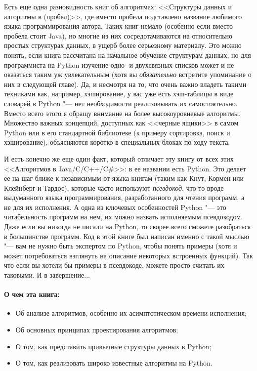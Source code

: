 Есть еще одна разновидность книг об алгоритмах: <<Структуры данных и алгоритмы в (пробел)>>, где вместо пробела подставлено название любимого языка программирования автора. Таких книг немало (особенно если вместо пробела стоит Java), но многие из них сосредотачиваются на относительно простых структурах данных, в ущерб более серьезному материалу. Это можно понять, если книга рассчитана на начальное обучение структурам данных, но для программиста на Python изучение одно- и двухсвязных списков может и не оказаться таким уж увлекательным (хотя вы \textit{обязательно} встретите упоминание о них в следующей главе). Да, и несмотря на то, что очень важно владеть такими техниками как, например, хэширование, у вас уже есть хэш-таблицы в виде словарей в Python "--- нет необходимости реализовывать их самостоятельно. Вместо всего этого я обращу внимание на более высокоуровневые алгоритмы. Множество важных концепций, доступных как <<черные ящики>> в самом Python или в его стандартной библиотеке (к примеру сортировка, поиск и хэширование), объясняются коротко в специальных блоках по ходу текста.

И есть конечно же еще один факт, который отличает эту книгу от всех этих <<Алгоритмов в Java/C/C++/C\#>>: в ее названии есть Python. Это делает ее на шаг ближе к независимым от языка книгам (таким как Кнут, Кормен или Клейнберг и Тардос), которые часто используют \textit{псевдокод}, что-то вроде выдуманного языка программирования, разработанного для чтения программ, а не для их исполнения. А одна из ключевых особенностей Python "--- это читабельность программ на нем, их можно назвать исполняемым псевдокодом. Даже если вы никогда не писали на Python, то скорее всего сможете разобраться в большинстве программ. Код в этой книге был написан именно с такой мыслью "--- вам не нужно быть экспертом по Python, чтобы понять примеры (хотя и может потребоваться взглянуть на описание некоторых встроенных функций). Так что если вы хотели бы примеры в псевдокоде, можете просто считать их таковыми. И в завершение...

\paragraph{О чем эта книга:}
\begin{itemize}
\item Об анализе алгоритмов, особенно их асимптотическом времени исполнения;
\item Об основных принципах проектирования алгоритмов;
\item О том, как представить привычные структуры данных в Python;
\item О том, как реализовать широко известные алгоритмы на Python.
\end{itemize}

